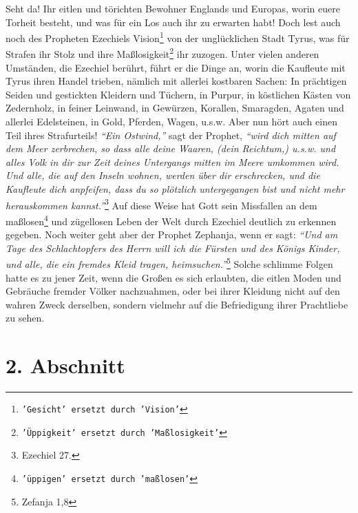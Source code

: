 Seht da! Ihr eitlen und törichten Bewohner Englands und
Europas, worin euere
Torheit besteht, und was für ein Los auch ihr zu erwarten habt! Doch lest
auch noch des Propheten Ezechiels Vision\footnote{\texttt{'Gesicht' ersetzt
durch 'Vision'}} von der unglücklichen Stadt Tyrus, was
für Strafen ihr Stolz und ihre Maßlosigkeit\footnote{\texttt{'Üppigkeit' ersetzt
durch 'Maßlosigkeit'}} ihr zuzogen. Unter vielen anderen
Umständen, die Ezechiel berührt, führt er die Dinge an, worin die Kaufleute mit
Tyrus ihren Handel trieben, nämlich mit allerlei kostbaren Sachen: In prächtigen
Seiden und gestickten Kleidern und Tüchern, in Purpur, in köstlichen Kästen von
Zedernholz, in feiner Leinwand, in Gewürzen, Korallen, Smaragden,
Agaten und
allerlei Edelsteinen, in Gold, Pferden, Wagen, u.s.w. Aber nun hört auch einen
Teil ihres Strafurteils! \textit{"`Ein Ostwind,"'} sagt der
Prophet,
\textit{"`wird dich mitten
auf dem Meer zerbrechen, so dass alle deine Waaren, (dein Reichtum,) u.s.w.
und alles Volk in dir zur Zeit deines Untergangs mitten im Meere umkommen wird.
Und alle, die auf den Inseln wohnen, werden über dir erschrecken, und die
Kaufleute dich anpfeifen, dass du so plötzlich untergegangen bist und nicht mehr
herauskommen kannst."'}\footnote{Ezechiel 27.}
Auf diese Weise hat Gott sein Missfallen
an dem maßlosen\footnote{\texttt{'üppigen' ersetzt durch 'maßlosen'}} und
zügellosen Leben der Welt durch Ezechiel deutlich zu erkennen
gegeben. Noch weiter geht aber der Prophet Zephanja, wenn er sagt:
\textit{"`Und am Tage
des Schlachtopfers des Herrn will ich  die Fürsten und des Königs
Kinder, und alle, die ein fremdes Kleid tragen, heimsuchen."'}\footnote{Zefanja
1,8}
Solche
schlimme Folgen hatte es zu jener Zeit, wenn die Großen es sich erlaubten, die
eitlen Moden und Gebräuche fremder Völker nachzuahmen, oder bei ihrer
Kleidung
nicht auf den wahren Zweck derselben, sondern vielmehr auf die Befriedigung
ihrer Prachtliebe zu sehen.

\section{2. Abschnitt} \label{kap15_ab2}

